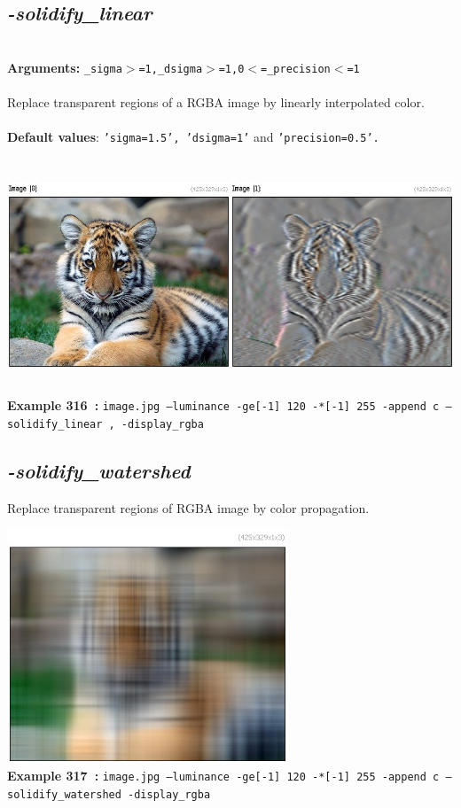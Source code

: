 \documentclass[a4paper,11pt,twoside]{book}
\begin{document}
\subsection{\emph{-solidify\_linear} }\vspace*{-0.5em}
~\\\textbf{Arguments: } 
{\small \texttt{\_sigma$>$=1,\_dsigma$>$=1,0$<$=\_precision$<$=1}}\\~\\
Replace transparent regions of a RGBA image by linearly interpolated color.
~\\~\\\textbf{Default values}: {\small \texttt{'sigma=1.5', 'dsigma=1'} and \texttt{'precision=0.5'.}}
\begin{center}\includegraphics[keepaspectratio=true,height=7cm,width=\textwidth]{img/gmic_def316.jpg}\\
{\footnotesize \textbf{Example 316~:} \texttt{image.jpg --luminance -ge[-1] 120 -*[-1] 255 -append c --solidify\_linear , -display\_rgba}}
\end{center}

\subsection{\emph{-solidify\_watershed} }\vspace*{-0.5em}
Replace transparent regions of RGBA image by color propagation.
\begin{center}\includegraphics[keepaspectratio=true,height=7cm,width=\textwidth]{img/gmic_def317.jpg}\\
{\footnotesize \textbf{Example 317~:} \texttt{image.jpg --luminance -ge[-1] 120 -*[-1] 255 -append c --solidify\_watershed -display\_rgba}}
\end{center}
\end{document}
